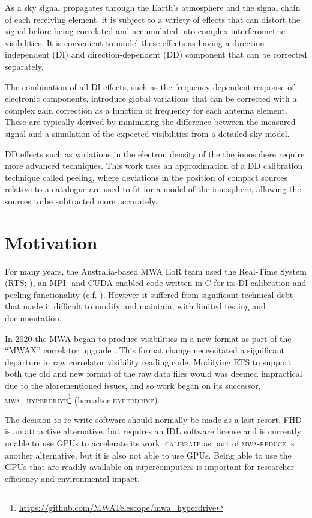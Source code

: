 \documentclass[summary]{ursi}
\newcommand{\hyperdrive}{\textsc{hyperdrive}}\newcommand{\mwalib}{\textsc{mwalib}}
\newcommand{\rts}{\textsc{RTS}}
\newcommand{\mwareduce}{\textsc{mwa-reduce}}
\newcommand{\calibrate}{\textsc{calibrate}}
\newcommand{\fhd}{\textsc{FHD}}
\newcommand{\clang}{\textsc{C}}
\newcommand{\cuda}{\textsc{CUDA}}
\begin{document}
As a sky signal propagates through the Earth's atmosphere and the signal chain of each receiving element, it is subject to a variety of effects that can distort the signal before being correlated and accumulated into complex interferometric visibilities. 
It is convenient to model these effects as having a direction-independent (DI) and direction-dependent (DD) component that can be corrected separately.

The combination of all DI effects, such as the frequency-dependent response of electronic components, introduce global variations that can be corrected with a complex gain correction as a function of frequency for each antenna element. These are typically derived by minimizing the difference between the measured signal and a simulation of the expected visibilities from a detailed sky model.

DD effects such as variations in the electron density of the the ionosphere require more advanced techniques.
This work uses an approximation of a DD calibration technique called peeling, where deviations in the position of compact sources relative to a catalogue are used to fit for a model of the ionosphere, allowing the sources to be subtracted more accurately. 

\section{Motivation}
For many years, the Australia-based MWA EoR team used the Real-Time System (RTS; \cite{mitchell2008}), an \textsc{MPI}- and \cuda{}-enabled code written in \clang{} for its DI calibration and peeling functionality (c.f. \cite{jordan2017,Trott2020,chege2021}). However it suffered from significant technical debt that made it difficult to modify and maintain, with limited testing and documentation. 

In 2020 the MWA began to produce visibilities in a new format as part of the ``MWAX'' correlator upgrade \cite{morrison2023}. 
This format change necessitated a significant departure in raw correlator visibility reading code. 
Modifying \rts{} to support both the old and new format of the raw data files would was deemed impractical due to the aforementioned issues, and so work began on its successor, \textsc{mwa\_hyperdrive}\footnote{\url{https://github.com/MWATelescope/mwa_hyperdrive}} (hereafter \hyperdrive{}).

The decision to re-write software should normally be made as a last resort.
\fhd{} \cite{Barry2019} is an attractive alternative, but requires an IDL software license and is currently unable to use GPUs to accelerate its work. 
\calibrate{} as part of \mwareduce{} \cite{offringa2016} is another alternative, but it is also not able to use GPUs. 
Being able to use the GPUs that are readily available on supercomputers is important for researcher efficiency and environmental impact.
\end{document}

